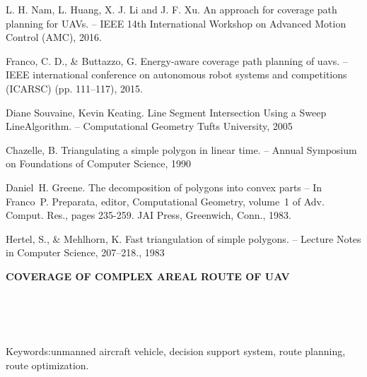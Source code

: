 \begin{thebibliography}{99}
	
	
	\re{} L. H. Nam, L. Huang, X. J. Li and J. F. Xu. An approach for coverage path planning for UAVs. -- IEEE 14th International Workshop on Advanced Motion Control (AMC), 2016.
	
	\re{} Franco, C. D., \& Buttazzo, G. Energy-aware coverage path planning of uavs. -- IEEE international conference on autonomous robot systems and competitions
	(ICARSC) (pp. 111–117), 2015.
	
	\re{} Diane Souvaine, Kevin Keating. Line Segment Intersection Using a Sweep LineAlgorithm. -- Computational Geometry Tufts University, 2005
	
	\re{} Chazelle, B. Triangulating a simple polygon in linear time. --  Annual Symposium on Foundations of Computer Science, 1990
	
	\re{} Daniel H. Greene. The decomposition of polygons into convex parts -- In Franco P. Preparata, editor, Computational Geometry, volume 1 of Adv. Comput. Res., pages 235-259. JAI Press, Greenwich, Conn., 1983.
	
	\re{} Hertel, S., \& Mehlhorn, K. Fast triangulation of simple polygons. -- Lecture Notes in Computer Science, 207–218., 1983
	
\end{thebibliography}

\begin{center}
	\textbf{COVERAGE OF COMPLEX AREAL ROUTE OF UAV} %
\end{center}

\begin{flushleft}
	 \\
	 \\
	 \\
\end{flushleft}


Keywords:unmanned aircraft vehicle, decision support system, route planning, route optimization.

\clearpage